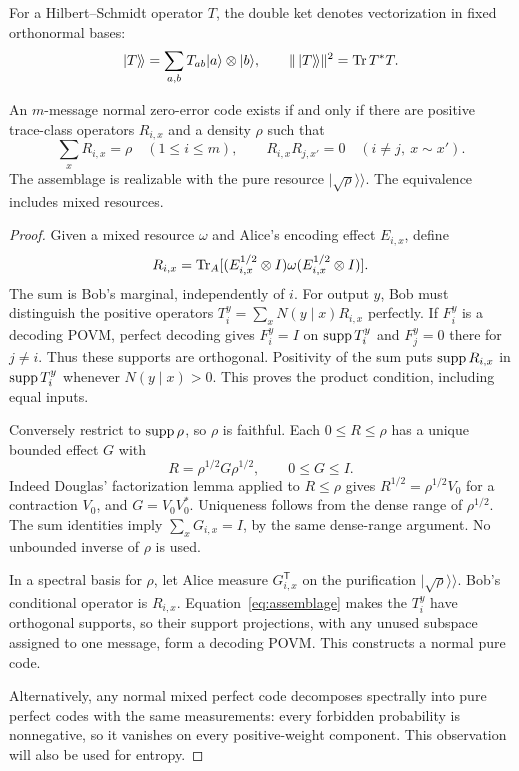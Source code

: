 For a Hilbert--Schmidt operator $T$, the double ket denotes vectorization in fixed orthonormal bases:
\[
 |T\rangle\!\rangle=\sum_{a,b}T_{ab}|a\rangle\otimes|b\rangle,
 \qquad \|\,|T\rangle\!\rangle\|^2=\operatorname{Tr} T^*T.
\]
\begin{lemma}\label{lem:assemblage}
An $m$-message normal zero-error code exists if and only if there are positive trace-class operators $R_{i,x}$ and a density $\rho$ such that
\begin{equation}\label{eq:assemblage}
 \sum_xR_{i,x}=\rho\quad(1\leq i\leq m),\qquad
 R_{i,x}R_{j,x'}=0\quad(i\ne j,\ x\sim x').
\end{equation}
The assemblage is realizable with the pure resource $|\sqrt\rho\rangle\!\rangle$. The equivalence includes mixed resources.
\end{lemma}
\begin{proof}
Given a mixed resource $\omega$ and Alice's encoding effect $E_{i,x}$, define
\[
 R_{i,x}=\operatorname{Tr}_A[(E_{i,x}^{1/2}\otimes I)\omega(E_{i,x}^{1/2}\otimes I)].
\]
The sum is Bob's marginal, independently of $i$. For output $y$, Bob must distinguish the positive operators $T_i^y=\sum_xN(y\mid x)R_{i,x}$ perfectly. If $F_i^y$ is a decoding POVM, perfect decoding gives $F_i^y=I$ on $\operatorname{supp} T_i^y$ and $F_j^y=0$ there for $j\ne i$. Thus these supports are orthogonal. Positivity of the sum puts $\operatorname{supp} R_{i,x}$ in $\operatorname{supp} T_i^y$ whenever $N(y\mid x)>0$. This proves the product condition, including equal inputs.

Conversely restrict to $\operatorname{supp}\rho$, so $\rho$ is faithful. Each $0\leq R\leq\rho$ has a unique bounded effect $G$ with
\begin{equation}\label{eq:douglas}
 R=\rho^{1/2}G\rho^{1/2},\qquad 0\leq G\leq I.
\end{equation}
Indeed Douglas' factorization lemma \cite{Douglas} applied to $R\leq\rho$ gives $R^{1/2}=\rho^{1/2}V_0$ for a contraction $V_0$, and $G=V_0V_0^*$. Uniqueness follows from the dense range of $\rho^{1/2}$. The sum identities imply $\sum_xG_{i,x}=I$, by the same dense-range argument. No unbounded inverse of $\rho$ is used.

In a spectral basis for $\rho$, let Alice measure $G_{i,x}^{\mathsf T}$ on the purification $|\sqrt\rho\rangle\!\rangle$. Bob's conditional operator is $R_{i,x}$. Equation~\eqref{eq:assemblage} makes the $T_i^y$ have orthogonal supports, so their support projections, with any unused subspace assigned to one message, form a decoding POVM. This constructs a normal pure code.

Alternatively, any normal mixed perfect code decomposes spectrally into pure perfect codes with the same measurements: every forbidden probability is nonnegative, so it vanishes on every positive-weight component. This observation will also be used for entropy.
\end{proof}

